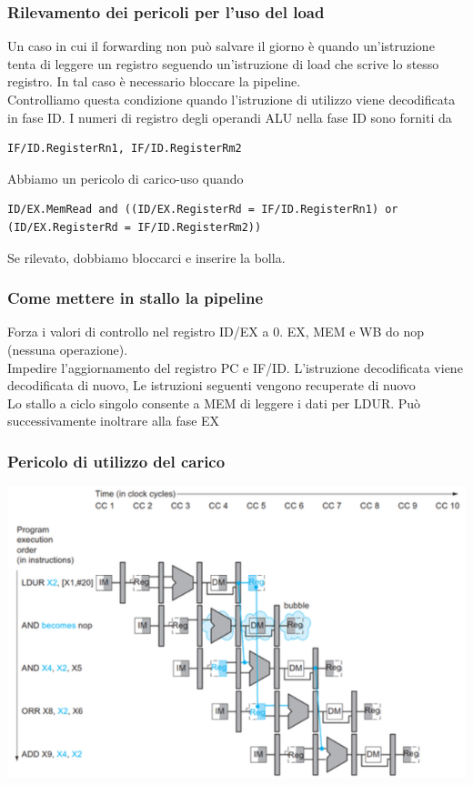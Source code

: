 \documentclass[12pt,a4paper]{article}
\begin{document}
\subsubsection{Rilevamento dei pericoli per l'uso del load}
Un caso in cui il forwarding non può salvare il giorno è quando un'istruzione tenta di leggere un registro seguendo un'istruzione di load che scrive lo stesso registro. In tal caso è necessario bloccare la pipeline.\\
Controlliamo questa condizione quando l'istruzione di utilizzo viene decodificata in fase ID. I numeri di registro degli operandi ALU nella fase ID sono forniti da
\begin{center}
\begin{minipage}{.2\linewidth}
\begin{verbatim}
IF/ID.RegisterRn1, IF/ID.RegisterRm2
\end{verbatim}
\end{minipage}
\end{center}
Abbiamo un pericolo di carico-uso quando
\begin{center}
\begin{minipage}{.2\linewidth}
\begin{verbatim}
ID/EX.MemRead and ((ID/EX.RegisterRd = IF/ID.RegisterRn1) or (ID/EX.RegisterRd = IF/ID.RegisterRm2))
\end{verbatim}
\end{minipage}
\end{center}
Se rilevato, dobbiamo bloccarci e inserire la bolla.

\subsubsection{Come mettere in stallo la pipeline}
Forza i valori di controllo nel registro ID/EX a 0. EX, MEM e WB do nop (nessuna operazione).\\
Impedire l'aggiornamento del registro PC e IF/ID. L'istruzione decodificata viene decodificata di nuovo, Le istruzioni seguenti vengono recuperate di nuovo\\
Lo stallo a ciclo singolo consente a MEM di leggere i dati per LDUR. Può successivamente inoltrare alla fase EX

\subsubsection{Pericolo di utilizzo del carico}
\begin{center}
\includegraphics[width=0.6\columnwidth]{img/loaduse.png}
\end{center}
\end{document}
